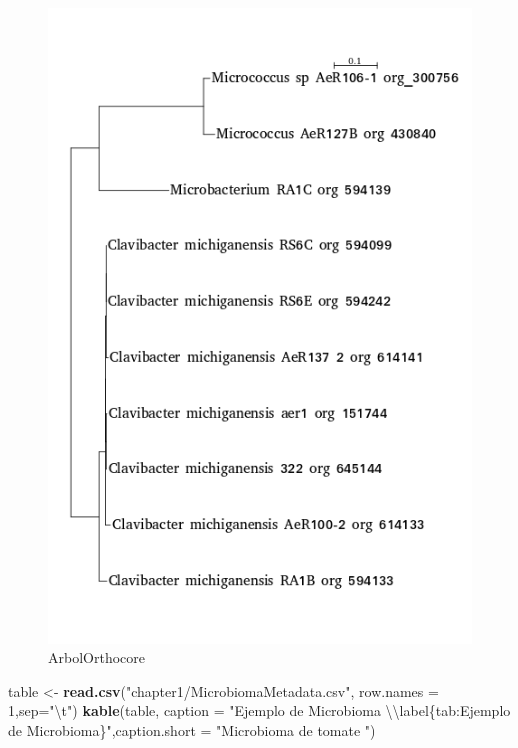 \documentclass[]{article}
\newenvironment{Shaded}{\begin{snugshade}}{\end{snugshade}}
\newcommand{\KeywordTok}[1]{\textcolor[rgb]{0.13,0.29,0.53}{\textbf{{#1}}}}
\newcommand{\DataTypeTok}[1]{\textcolor[rgb]{0.13,0.29,0.53}{{#1}}}
\newcommand{\DecValTok}[1]{\textcolor[rgb]{0.00,0.00,0.81}{{#1}}}
\newcommand{\CharTok}[1]{\textcolor[rgb]{0.31,0.60,0.02}{{#1}}}
\newcommand{\StringTok}[1]{\textcolor[rgb]{0.31,0.60,0.02}{{#1}}}
\newcommand{\NormalTok}[1]{{#1}}
\begin{document}
\begin{figure}[h!tbp]
\centering
\includegraphics[angle = 0,scale = 1]{chapter1/ArbolOrthocore.png}
\caption[ArbolOrthocore]{\normalsize{ArbolOrthocore}}
\label{fig:ArbolOrthocore}
\end{figure}

\begin{Shaded}
\begin{Highlighting}[]
\NormalTok{table <-}\StringTok{ }\KeywordTok{read.csv}\NormalTok{(}\StringTok{"chapter1/MicrobiomaMetadata.csv"}\NormalTok{, }\DataTypeTok{row.names =} \DecValTok{1}\NormalTok{,}\DataTypeTok{sep=}\StringTok{"}\CharTok{\textbackslash{}t}\StringTok{"}\NormalTok{)}
\KeywordTok{kable}\NormalTok{(table,  }\DataTypeTok{caption =} \StringTok{"Ejemplo de Microbioma }\CharTok{\textbackslash{}\textbackslash{}}\StringTok{label\{tab:Ejemplo de Microbioma\}"}\NormalTok{,}\DataTypeTok{caption.short =} \StringTok{"Microbioma de tomate "}\NormalTok{)}
\end{Highlighting}
\end{Shaded}
\end{document}
